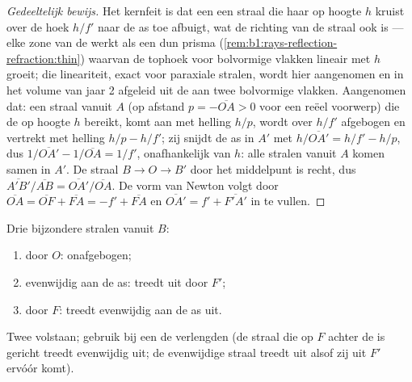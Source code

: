 \begin{proof}[Gedeeltelijk bewijs]
Het kernfeit is dat een  een straal die haar op hoogte $h$ kruist
over de hoek $h/f'$ naar de as toe afbuigt, wat de richting van de straal ook
is --- elke zone van de  werkt als een dun prisma (\cref{rem:b1:rays-reflection-refraction:thin})
waarvan de tophoek voor bolvormige vlakken lineair met $h$ groeit; die
lineariteit, exact voor paraxiale stralen, wordt hier aangenomen en in het
volume van jaar 2 afgeleid uit de  aan twee bolvormige
vlakken. Aangenomen dat: een straal vanuit $A$ (op afstand
$p = -\overline{OA} > 0$ voor een reëel voorwerp) die de  op hoogte $h$
bereikt, komt aan met helling $h/p$, wordt over $h/f'$ afgebogen en vertrekt
met helling $h/p - h/f'$; zij snijdt de as
in $A'$ met $h/\overline{OA'} = h/f' - h/p$, dus $1/\overline{OA'}
- 1/\overline{OA} = 1/f'$, onafhankelijk van $h$: alle stralen vanuit $A$
komen samen in $A'$. De straal $B \to O \to B'$ door het middelpunt is recht, dus
$\overline{A'B'}/\overline{AB} = \overline{OA'}/\overline{OA}$. De vorm van
Newton volgt door $\overline{OA} = \overline{OF} + \overline{FA}
= -f' + \overline{FA}$ en $\overline{OA'} = f' + \overline{F'A'}$ in te vullen.
\end{proof}

\begin{method}\label{met:b1:mirrors-thin-lenses:lensrays}
Drie bijzondere stralen vanuit $B$:
\begin{enumerate}
  \item door $O$: onafgebogen;
  \item evenwijdig aan de as: treedt uit door $F'$;
  \item door $F$: treedt evenwijdig aan de as uit.
\end{enumerate}
Twee volstaan; gebruik bij een  de verlengden (de straal die
op $F$ achter de  is gericht treedt evenwijdig uit; de evenwijdige straal
treedt uit alsof zij uit $F'$ ervóór komt).
\end{method}

